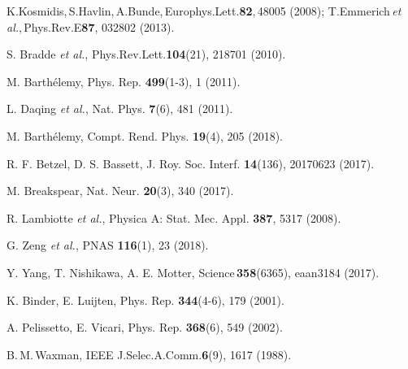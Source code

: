 \documentclass[aps, groupedaddress, superscriptaddress, prl, reprint]{revtex4-1}
\begin{document}
\begin{thebibliography}{99}
 K.Kosmidis,\,S.Havlin,\,A.Bunde,\,Europhys.Lett.\textbf{82},\,48005 (2008); 
T.Emmerich\,{\em et al.},\,Phys.Rev.E\textbf{87}, 032802 (2013).

 S. Bradde {\em et al.}, Phys.Rev.Lett.\textbf{104}(21), 218701 (2010).

 M. Barth\'elemy, Phys. Rep. \textbf{499}(1-3), 1 (2011).

 L. Daqing \emph{et al.}, Nat. Phys. \textbf{7}(6), 481 (2011).





 M. Barth\'elemy, Compt. Rend. Phys. \textbf{19}(4), 205 (2018).



 R. F. Betzel, D. S. Bassett, J. Roy. Soc. Interf. \textbf{14}(136), 20170623 (2017).

 M. Breakspear, Nat. Neur. \textbf{20}(3), 340 (2017).

 R. Lambiotte {\em et al.}, Physica A: Stat. Mec. Appl. \textbf{387}, 5317 (2008).

 G. Zeng {\em et al.}, PNAS \textbf{116}(1), 23 (2018).

 Y. Yang, T. Nishikawa, A. E. Motter, Science\,\textbf{358}(6365), eaan3184 (2017).

 K. Binder, E. Luijten, Phys. Rep. \textbf{344}(4-6), 179 (2001). 

 A. Pelissetto, E. Vicari, Phys. Rep. \textbf{368}(6), 549 (2002).

 B.\,M.\,Waxman, IEEE J.Selec.A.Comm.\textbf{6}(9), 1617 (1988).



\end{thebibliography}
\end{document}
